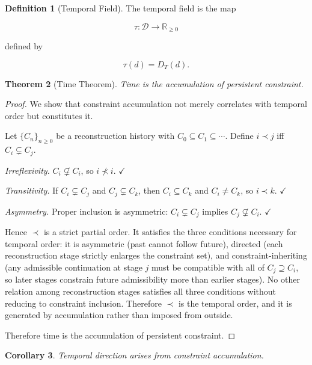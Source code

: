 \documentclass[12pt,oneside]{article}
\newtheorem{theorem}{Theorem}[section] \newtheorem{lemma}[theorem]{Lemma} \newtheorem{proposition}[theorem]{Proposition} \newtheorem{corollary}[theorem]{Corollary}
\theoremstyle{definition}
\newtheorem{definition}[theorem]{Definition} \newtheorem{axiom}[theorem]{Axiom} \newtheorem{remark}[theorem]{Remark} \newtheorem{example}[theorem]{Example}
\begin{document}
\begin{definition}[Temporal Field]

The temporal field is the map

\[
\tau :
\mathcal D
\rightarrow
\mathbb R_{\ge 0}
\]

defined by

\[
\tau(d)
=
D_T(d).
\]

\end{definition}

\begin{theorem}[Time Theorem]

Time is the accumulation of persistent constraint.

\end{theorem}

\begin{proof}

We show that constraint accumulation not merely correlates with temporal order but constitutes it.

Let $\{C_n\}_{n \geq 0}$ be a reconstruction history with $C_0 \subseteq C_1 \subseteq \cdots$. Define $i \prec j$ iff $C_i \subsetneq C_j$.

\emph{Irreflexivity.} $C_i \not\subsetneq C_i$, so $i \not\prec i$. $\checkmark$

\emph{Transitivity.} If $C_i \subsetneq C_j$ and $C_j \subsetneq C_k$, then $C_i \subseteq C_k$ and $C_i \neq C_k$, so $i \prec k$. $\checkmark$

\emph{Asymmetry.} Proper inclusion is asymmetric: $C_i \subsetneq C_j$ implies $C_j \not\subsetneq C_i$. $\checkmark$

Hence $\prec$ is a strict partial order. It satisfies the three conditions necessary for temporal order: it is asymmetric (past cannot follow future), directed (each reconstruction stage strictly enlarges the constraint set), and constraint-inheriting (any admissible continuation at stage $j$ must be compatible with all of $C_j \supseteq C_i$, so later stages constrain future admissibility more than earlier stages). No other relation among reconstruction stages satisfies all three conditions without reducing to constraint inclusion. Therefore $\prec$ is the temporal order, and it is generated by accumulation rather than imposed from outside.

Therefore time is the accumulation of persistent constraint.

\end{proof}

\begin{corollary}

Temporal direction arises from constraint accumulation.

\end{corollary}
\end{document}
